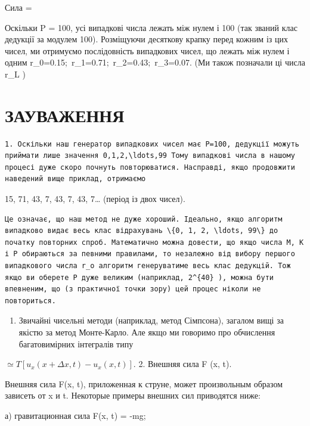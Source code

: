 \documentclass[
  ukrainian,
]{article}
\providecommand{\tightlist}{%
  \setlength{\itemsep}{0pt}\setlength{\parskip}{0pt}}
\begin{document}
Сила =

Оскільки P = 100, усі випадкові числа лежать між нулем і 100 (так званий
клас дедукції за модулем 100). Розміщуючи десяткову крапку перед кожним
із цих чисел, ми отримуємо послідовність випадкових чисел, що лежать між
нулем і одним r\_0=0.15;~r\_1=0.71;~r\_2=0.43;~r\_3=0.07. (Ми також
позначали ці числа r\_L )

\section{ЗАУВАЖЕННЯ}\label{ux437ux430ux443ux432ux430ux436ux435ux43dux43dux44f-5}

\begin{verbatim}
1. Оскільки наш генератор випадкових чисел має P=100, дедукції можуть приймати лише значення 0,1,2,\ldots,99 Тому випадкові числа в нашому процесі дуже скоро почнуть повторюватися. Насправді, якщо продовжити наведений вище приклад, отримаємо
\end{verbatim}

15, 71, 43, 7, 43, 7, 43, 7\ldots{} (період із двох чисел).

\begin{verbatim}
Це означає, що наш метод не дуже хороший. Ідеально, якщо алгоритм випадково видає весь клас відрахувань \{0, 1, 2, \ldots, 99\} до початку повторних спроб. Математично можна довести, що якщо числа M, K і P обираються за певними правилами, то незалежно від вибору першого випадкового числа r_o алгоритм генеруватиме весь клас дедукцій. Тож якщо ви оберете P дуже великим (наприклад, 2^{40} ), можна бути впевненим, що (з практичної точки зору) цей процес ніколи не повториться.
\end{verbatim}

\begin{enumerate}
\def\labelenumi{\arabic{enumi}.}
\setcounter{enumi}{1}
\tightlist
\item
  Звичайні чисельні методи (наприклад, метод Сімпсона), загалом вищі за
  якістю за метод Монте-Карло. Але якщо ми говоримо про обчислення
  багатовимірних інтегралів типу
\end{enumerate}

\(\simeq T [u_x(x + \Delta x, t) - u_x(x, t)].\) 2. Внешняя сила F (x,
t).

Внешняя сила F(x, t), приложенная к струне, может произвольным образом
зависеть от x и t. Некоторые примеры внешних сил приводятся ниже:

а) гравитационная сила F(x, t) = -mg;
\end{document}
